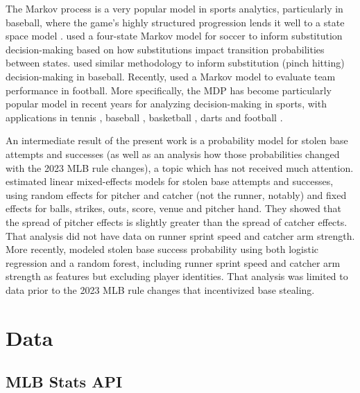 \documentclass{article}
\begin{document}
    The Markov process is a very popular model in sports analytics, particularly in baseball, where the game's highly structured progression lends it well to a state space model \citep{bukiet_markov_1997}. \cite{hirotsu_using_2002} used a four-state Markov model for soccer to inform substitution decision-making based on how substitutions impact transition probabilities between states. \cite{hirotsu_markov_2003} used similar methodology to inform substitution (pinch hitting) decision-making in baseball. Recently, \cite{chan_points_2021} used a Markov model to evaluate team performance in football. More specifically, the MDP has become particularly popular model in recent years for analyzing decision-making in sports, with applications in tennis \citep{nadimpalli_when_2013}, baseball \citep{hirotsu_using_2019}, basketball \citep{sandholtz_markov_2020}, darts \citep{baird_optimising_2020} and football \citep{biro_reinforcement_2022}.

    An intermediate result of the present work is a probability model for stolen base attempts and successes (as well as an analysis how those probabilities changed with the 2023 MLB rule changes), a topic which has not received much attention. \cite{loughin_assessing_2008} estimated linear mixed-effects models for stolen base attempts and successes, using random effects for pitcher and catcher (not the runner, notably) and fixed effects for balls, strikes, outs, score, venue and pitcher hand. They showed that the spread of pitcher effects is slightly greater than the spread of catcher effects. That analysis did not have data on runner sprint speed and catcher arm strength. More recently, \cite{stanley_modeling_2023} modeled stolen base success probability using both logistic regression and a random forest, including runner sprint speed and catcher arm strength as features but excluding player identities. That analysis was limited to data prior to the 2023 MLB rule changes that incentivized base stealing.

  \section{Data}

    \subsection{MLB Stats API}
    \label{sec:statsapi}
\end{document}
